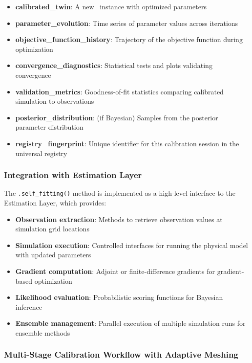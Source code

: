 \begin{itemize}
\item \textbf{calibrated\_twin}: A new \hydrot\ instance with optimized parameters
\item \textbf{parameter\_evolution}: Time series of parameter values across iterations
\item \textbf{objective\_function\_history}: Trajectory of the objective function during optimization
\item \textbf{convergence\_diagnostics}: Statistical tests and plots validating convergence
\item \textbf{validation\_metrics}: Goodness-of-fit statistics comparing calibrated simulation to observations
\item \textbf{posterior\_distribution}: (if Bayesian) Samples from the posterior parameter distribution
\item \textbf{registry\_fingerprint}: Unique identifier for this calibration session in the universal registry
\end{itemize}

\subsubsection{Integration with Estimation Layer}

The \texttt{.self\_fitting()} method is implemented as a high-level interface to the Estimation Layer, which provides:

\begin{itemize}
\item \textbf{Observation extraction}: Methods to retrieve observation values at simulation grid locations
\item \textbf{Simulation execution}: Controlled interfaces for running the physical model with updated parameters
\item \textbf{Gradient computation}: Adjoint or finite-difference gradients for gradient-based optimization
\item \textbf{Likelihood evaluation}: Probabilistic scoring functions for Bayesian inference
\item \textbf{Ensemble management}: Parallel execution of multiple simulation runs for ensemble methods
\end{itemize}

\subsubsection{Multi-Stage Calibration Workflow with Adaptive Meshing}

